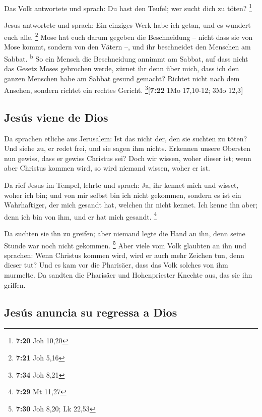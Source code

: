  Das Volk antwortete und sprach: Du hast den Teufel; wer
sucht dich zu töten? \footnote{\textbf{7:20} Joh 10,20}

 Jesus antwortete und sprach: Ein einziges Werk habe ich
getan, und es wundert euch alle. \footnote{\textbf{7:21} Joh 5,16}
 Mose hat euch darum gegeben die Beschneidung -- nicht
dass sie von Mose kommt, sondern von den Vätern --, und ihr beschneidet
den Menschen am Sabbat. \textsuperscript{b}  So ein
Mensch die Beschneidung annimmt am Sabbat, auf dass nicht das Gesetz
Moses gebrochen werde, zürnet ihr denn über mich, dass ich den ganzen
Menschen habe am Sabbat gesund gemacht?  Richtet nicht
nach dem Ansehen, sondern richtet ein rechtes Gericht.
\footnote{\textbf{7:34} Joh 8,21}{[}\textbf{7:22} 1Mo 17,10-12; 3Mo
12,3{]}

\hypertarget{jesuxfas-viene-de-dios}{%
\subsection{Jesús viene de Dios}\label{jesuxfas-viene-de-dios}}

 Da sprachen etliche aus Jerusalem: Ist das nicht der,
den sie suchten zu töten?  Und siehe zu, er redet frei,
und sie sagen ihm nichts. Erkennen unsere Obersten nun gewiss, dass er
gewiss Christus sei?  Doch wir wissen, woher dieser ist;
wenn aber Christus kommen wird, so wird niemand wissen, woher er ist.

 Da rief Jesus im Tempel, lehrte und sprach: Ja, ihr
kennet mich und wisset, woher ich bin; und von mir selbst bin ich nicht
gekommen, sondern es ist ein Wahrhaftiger, der mich gesandt hat, welchen
ihr nicht kennet.  Ich kenne ihn aber; denn ich bin von
ihm, und er hat mich gesandt. \footnote{\textbf{7:29} Mt 11,27}

 Da suchten sie ihn zu greifen; aber niemand legte die
Hand an ihn, denn seine Stunde war noch nicht gekommen. \footnote{\textbf{7:30}
  Joh 8,20; Lk 22,53}  Aber viele vom Volk glaubten an
ihn und sprachen: Wenn Christus kommen wird, wird er auch mehr Zeichen
tun, denn dieser tut?  Und es kam vor die Pharisäer, dass
das Volk solches von ihm murmelte. Da sandten die Pharisäer und
Hohenpriester Knechte aus, das sie ihn griffen.

\hypertarget{jesuxfas-anuncia-su-regressa-a-dios}{%
\subsection{Jesús anuncia su regressa a
Dios}\label{jesuxfas-anuncia-su-regressa-a-dios}}

